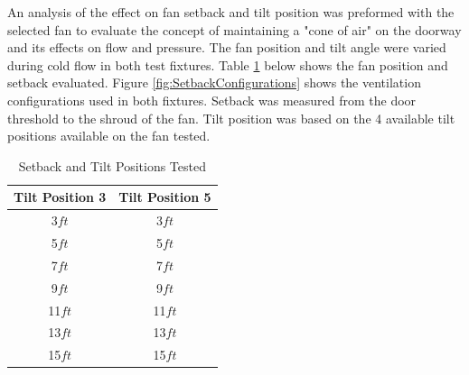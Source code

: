 \documentclass{article}
\begin{document}
An analysis of the effect on fan setback and tilt position was preformed with the selected fan to evaluate the concept of maintaining a "cone of air" on the doorway and its effects on flow and pressure. The fan position and tilt angle were varied during cold flow in both test fixtures. Table \ref{table:SetbackPositions} below shows the fan position and setback evaluated. Figure \ref{fig:SetbackConfigurations} shows the ventilation configurations used in both fixtures. Setback was measured from the door threshold to the shroud of the fan. Tilt position was based on the 4 available tilt positions available on the fan tested. 

\begin{table}[H]
	\caption{Setback and Tilt Positions Tested}
	\centering
	\begin{tabular}{|c|c|}
		\hline
		\textbf{Tilt Position 3} & \textbf{Tilt Position 5} \\ \hline \hline
		3$ft$ & 3$ft$ \\ \hline
		5$ft$ & 5$ft$ \\ \hline
		7$ft$ & 7$ft$ \\ \hline
		9$ft$ & 9$ft$ \\ \hline
		11$ft$ & 11$ft$ \\ \hline
		13$ft$ & 13$ft$ \\ \hline
		15$ft$ & 15$ft$ \\ \hline	
	\end{tabular}
	\label{table:SetbackPositions}
\end{table}
\end{document}
